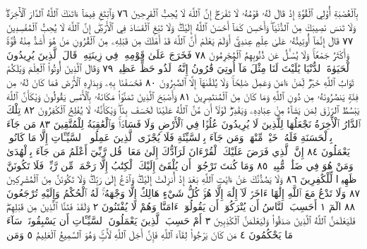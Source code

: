 بِٱلْعُصْبَةِ أُو۟لِي ٱلْقُوَّةِ إِذْ قَالَ لَهُۥ قَوْمُهُۥ لَا تَفْرَحْۖ إِنَّ ٱللَّهَ
لَا يُحِبُّ ٱلْفَرِحِينَ ٧٦ وَٱبْتَغِ فِيمَآ ءَاتَىٰكَ ٱللَّهُ ٱلدَّارَ ٱلْأٓخِرَةَۖ
وَلَا تَنسَ نَصِيبَكَ مِنَ ٱلدُّنْيَاۖ وَأَحْسِن كَمَآ أَحْسَنَ ٱللَّهُ إِلَيْكَۖ
وَلَا تَبْغِ ٱلْفَسَادَ فِي ٱلْأَرْضِۖ إِنَّ ٱللَّهَ لَا يُحِبُّ ٱلْمُفْسِدِينَ ٧٧
قَالَ إِنَّمَآ أُوتِيتُهُۥ عَلَىٰ عِلْمٍ عِندِيٓۚ أَوَلَمْ يَعْلَمْ أَنَّ ٱللَّهَ قَدْ أَهْلَكَ
مِن قَبْلِهِۦ مِنَ ٱلْقُرُونِ مَنْ هُوَ أَشَدُّ مِنْهُ قُوَّةࣰ وَأَكْثَرُ جَمْعࣰاۚ
وَلَا يُسْـَٔلُ عَن ذُنُوبِهِمُ ٱلْمُجْرِمُونَ ٧٨ فَخَرَجَ عَلَىٰ قَوْمِهِۦ
فِي زِينَتِهِۦۖ قَالَ ٱلَّذِينَ يُرِيدُونَ ٱلْحَيَوٰةَ ٱلدُّنْيَا يَٰلَيْتَ لَنَا
مِثْلَ مَآ أُوتِيَ قَٰرُونُ إِنَّهُۥ لَذُو حَظٍّ عَظِيمࣲ ٧٩ وَقَالَ ٱلَّذِينَ
أُوتُوا۟ ٱلْعِلْمَ وَيْلَكُمْ ثَوَابُ ٱللَّهِ خَيْرࣱ لِّمَنْ ءَامَنَ وَعَمِلَ
صَٰلِحࣰاۚ وَلَا يُلَقَّىٰهَآ إِلَّا ٱلصَّٰبِرُونَ ٨٠ فَخَسَفْنَا بِهِۦ
وَبِدَارِهِ ٱلْأَرْضَ فَمَا كَانَ لَهُۥ مِن فِئَةࣲ يَنصُرُونَهُۥ مِن دُونِ
ٱللَّهِ وَمَا كَانَ مِنَ ٱلْمُنتَصِرِينَ ٨١ وَأَصْبَحَ ٱلَّذِينَ تَمَنَّوْا۟
مَكَانَهُۥ بِٱلْأَمْسِ يَقُولُونَ وَيْكَأَنَّ ٱللَّهَ يَبْسُطُ ٱلرِّزْقَ لِمَن
يَشَآءُ مِنْ عِبَادِهِۦ وَيَقْدِرُۖ لَوْلَآ أَن مَّنَّ ٱللَّهُ عَلَيْنَا لَخَسَفَ بِنَاۖ
وَيْكَأَنَّهُۥ لَا يُفْلِحُ ٱلْكَٰفِرُونَ ٨٢ تِلْكَ ٱلدَّارُ ٱلْأٓخِرَةُ نَجْعَلُهَا لِلَّذِينَ
لَا يُرِيدُونَ عُلُوࣰّا فِي ٱلْأَرْضِ وَلَا فَسَادࣰاۚ وَٱلْعَٰقِبَةُ لِلْمُتَّقِينَ ٨٣
مَن جَآءَ بِٱلْحَسَنَةِ فَلَهُۥ خَيْرࣱ مِّنْهَاۖ وَمَن جَآءَ بِٱلسَّيِّئَةِ فَلَا
يُجْزَى ٱلَّذِينَ عَمِلُوا۟ ٱلسَّيِّـَٔاتِ إِلَّا مَا كَانُوا۟ يَعْمَلُونَ ٨٤
إِنَّ ٱلَّذِي فَرَضَ عَلَيْكَ ٱلْقُرْءَانَ لَرَآدُّكَ إِلَىٰ مَعَادࣲۚ قُل رَّبِّيٓ
أَعْلَمُ مَن جَآءَ بِٱلْهُدَىٰ وَمَنْ هُوَ فِي ضَلَٰلࣲ مُّبِينࣲ ٨٥ وَمَا كُنتَ
تَرْجُوٓا۟ أَن يُلْقَىٰٓ إِلَيْكَ ٱلْكِتَٰبُ إِلَّا رَحْمَةࣰ مِّن رَّبِّكَۖ فَلَا
تَكُونَنَّ ظَهِيرࣰا لِّلْكَٰفِرِينَ ٨٦ وَلَا يَصُدُّنَّكَ عَنْ ءَايَٰتِ
ٱللَّهِ بَعْدَ إِذْ أُنزِلَتْ إِلَيْكَۖ وَٱدْعُ إِلَىٰ رَبِّكَۖ وَلَا تَكُونَنَّ مِنَ
ٱلْمُشْرِكِينَ ٨٧ وَلَا تَدْعُ مَعَ ٱللَّهِ إِلَٰهًا ءَاخَرَۘ لَآ إِلَٰهَ إِلَّا هُوَۚ
كُلُّ شَيْءٍ هَالِكٌ إِلَّا وَجْهَهُۥۚ لَهُ ٱلْحُكْمُ وَإِلَيْهِ تُرْجَعُونَ ٨٨
الٓمٓ ١ أَحَسِبَ ٱلنَّاسُ أَن يُتْرَكُوٓا۟ أَن يَقُولُوٓا۟ ءَامَنَّا وَهُمْ
لَا يُفْتَنُونَ ٢ وَلَقَدْ فَتَنَّا ٱلَّذِينَ مِن قَبْلِهِمْۖ فَلَيَعْلَمَنَّ ٱللَّهُ ٱلَّذِينَ
صَدَقُوا۟ وَلَيَعْلَمَنَّ ٱلْكَٰذِبِينَ ٣ أَمْ حَسِبَ ٱلَّذِينَ يَعْمَلُونَ
ٱلسَّيِّـَٔاتِ أَن يَسْبِقُونَاۚ سَآءَ مَا يَحْكُمُونَ ٤ مَن كَانَ يَرْجُوا۟
لِقَآءَ ٱللَّهِ فَإِنَّ أَجَلَ ٱللَّهِ لَأٓتࣲۚ وَهُوَ ٱلسَّمِيعُ ٱلْعَلِيمُ ٥ وَمَن
